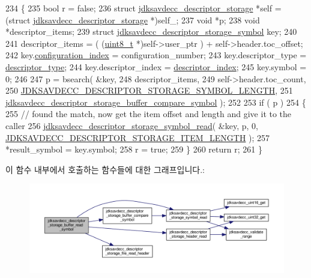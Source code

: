\begin{DoxyCode}
234 \{
235     \textcolor{keywordtype}{bool} r = \textcolor{keyword}{false};
236     \textcolor{keyword}{struct }\hyperlink{structjdksavdecc__descriptor__storage}{jdksavdecc\_descriptor\_storage} *\textcolor{keyword}{self} = (\textcolor{keyword}{struct }
      \hyperlink{structjdksavdecc__descriptor__storage}{jdksavdecc\_descriptor\_storage} *)self\_;
237     \textcolor{keywordtype}{void} *p;
238     \textcolor{keywordtype}{void} *descriptor\_items;
239     \textcolor{keyword}{struct }\hyperlink{structjdksavdecc__descriptor__storage__symbol}{jdksavdecc\_descriptor\_storage\_symbol} key;
240 
241     descriptor\_items = ( (\hyperlink{stdint_8h_aba7bc1797add20fe3efdf37ced1182c5}{uint8\_t} *)self->user\_ptr ) + \textcolor{keyword}{self}->header.toc\_offset;
242     key.\hyperlink{structjdksavdecc__descriptor__storage__symbol_afaad1bd7c66f9611e134d8c5ce98f444}{configuration\_index} = configuration\_number;
243     key.descriptor\_type = \hyperlink{structjdksavdecc__descriptor__storage__symbol_ab7c32b6c7131c13d4ea3b7ee2f09b78d}{descriptor\_type};
244     key.descriptor\_index = \hyperlink{structjdksavdecc__descriptor__storage__symbol_a042bbc76d835b82d27c1932431ee38d4}{descriptor\_index};
245     key.symbol = 0;
246 
247     p = bsearch( &key,
248                  descriptor\_items,
249                  self->header.toc\_count,
250                  \hyperlink{group__descriptor__storage__symbol_ga85d377aa36f28a057ec1261c2864dedb}{JDKSAVDECC\_DESCRIPTOR\_STORAGE\_SYMBOL\_LENGTH},
251                  \hyperlink{jdksavdecc__descriptor__storage_8c_ab8f6bb12e6b3842193992c6a3a5ccf4a}{jdksavdecc\_descriptor\_storage\_buffer\_compare\_symbol}
       );
252 
253     \textcolor{keywordflow}{if} ( p )
254     \{
255         \textcolor{comment}{// found the match, now get the item offset and length and give it to the caller}
256         \hyperlink{group__descriptor__storage__symbol_gaeec6b1c9baca472aa2b9ca085ae70d21}{jdksavdecc\_descriptor\_storage\_symbol\_read}( &key, p, 0, 
      \hyperlink{group__descriptor__storage__item_ga929fd9464abbbbf3d66fc15109d022b3}{JDKSAVDECC\_DESCRIPTOR\_STORAGE\_ITEM\_LENGTH} );
257         *result\_symbol = key.symbol;
258         r = \textcolor{keyword}{true};
259     \}
260     \textcolor{keywordflow}{return} r;
261 \}
\end{DoxyCode}


이 함수 내부에서 호출하는 함수들에 대한 그래프입니다.\+:
\nopagebreak
\begin{figure}[H]
\begin{center}
\leavevmode
\includegraphics[width=350pt]{group__jdksavdecc__descriptor__storage_ga37f13bb444e21c5244641d43ddf35419_cgraph}
\end{center}
\end{figure}




